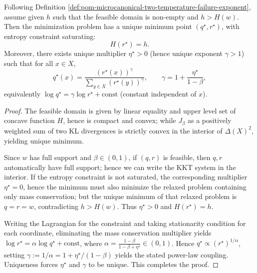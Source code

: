 \begin{theorem}\label{thm:pom-microcanonical-two-temperature-kkt-power-law}
Following Definition \ref{def:pom-microcanonical-two-temperature-failure-exponent}, assume given \(h\) such that the feasible domain is non-empty and \(h>\!H(w)\).
Then the minimization problem has a unique minimum point \((q^\star,r^\star)\), with entropy constraint saturating:
\[
H(r^\star)=h.
\]
Moreover, there exists unique multiplier \(\eta^\star>0\) (hence unique exponent \(\gamma>1\)) such that for all \(x\in X\),
\[
q^\star(x)=\frac{(r^\star(x))^{\gamma}}{\sum_{y\in X}(r^\star(y))^{\gamma}},
\qquad
\gamma=1+\frac{\eta^\star}{1-\beta},
\]
equivalently
\(
\log q^\star=\gamma\log r^\star+\mathrm{const}
\)
(constant independent of \(x\)).
\end{theorem}
\begin{proof}
The feasible domain is given by linear equality and upper level set of concave function \(H\), hence is compact and convex; while \(J_\beta\) as a positively weighted sum of two KL divergences is strictly convex in the interior of \(\Delta(X)^2\), yielding unique minimum.
\par
Since \(w\) has full support and \(\beta\in(0,1)\), if \((q,r)\) is feasible, then \(q,r\) automatically have full support; hence we can write the KKT system in the interior.
If the entropy constraint is not saturated, the corresponding multiplier \(\eta^\star=0\), hence the minimum must also minimize the relaxed problem containing only mass conservation; but the unique minimum of that relaxed problem is \(q=r=w\), contradicting \(h>H(w)\).
Thus \(\eta^\star>0\) and \(H(r^\star)=h\).
\par
Writing the Lagrangian for the constraint and taking stationarity condition for each coordinate, eliminating the mass conservation multiplier yields
\(
\log r^\star=\alpha\log q^\star+\mathrm{const}
\),
where
\(
\alpha=\frac{1-\beta}{1-\beta+\eta^\star}\in(0,1)
\).
Hence \(q^\star\propto (r^\star)^{1/\alpha}\), setting \(\gamma:=1/\alpha=1+\eta^\star/(1-\beta)\) yields the stated power-law coupling.
Uniqueness forces \(\eta^\star\) and \(\gamma\) to be unique. This completes the proof.
\end{proof}

